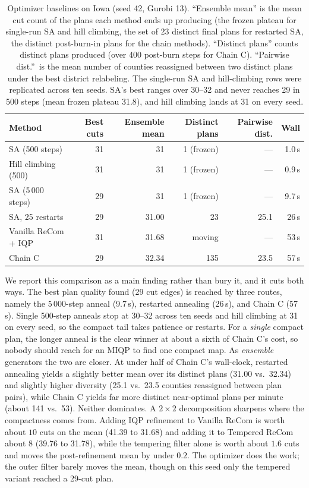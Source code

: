 \documentclass[11pt]{article}
\begin{document}
\begin{table}[H]
\centering
\small
\begin{tabular}{lrrrrr}
\toprule
Method & Best cuts & Ensemble mean & Distinct plans & Pairwise dist. & Wall \\
\midrule
SA (500 steps)           & 31 & 31    & 1 (frozen)  & ---  & 1.0\,s \\
Hill climbing (500)      & 31 & 31    & 1 (frozen)  & ---  & 0.9\,s \\
SA (5\,000 steps)        & 29 & 31    & 1 (frozen)  & ---  & 9.7\,s \\
SA, 25 restarts          & 29 & 31.00 & 23          & 25.1 & 26\,s \\
Vanilla ReCom + IQP      & 31 & 31.68 & moving      & ---  & 53\,s \\
Chain C                  & 29 & 32.34 & 135         & 23.5 & 57\,s \\
\bottomrule
\end{tabular}
\caption{Optimizer baselines on Iowa (seed 42,
  Gurobi 13). ``Ensemble mean'' is the mean cut count of the plans
  each method ends up producing (the frozen plateau for single-run
  SA and hill climbing, the set of 23 distinct final plans for
  restarted SA, the distinct post-burn-in plans for the chain
  methods). ``Distinct plans'' counts distinct plans produced (over
  400 post-burn steps for Chain C). ``Pairwise dist.''\ is the mean
  number of counties reassigned between two distinct plans under the
  best district relabeling. The single-run SA and hill-climbing rows
  were replicated across ten seeds. SA's best ranges over 30--32 and
  never reaches 29 in 500 steps (mean frozen plateau 31.8), and hill
  climbing lands at 31 on every
  seed.}\label{tab:optimizer-baselines}
\end{table}

We report this comparison as a main finding rather than bury it, and
it cuts both ways. The best plan quality found (29 cut edges) is
reached by three routes, namely the $5\,000$-step anneal (9.7\,s),
restarted annealing (26\,s), and Chain C (57\,s). Single 500-step
anneals stop at 30--32 across ten seeds and hill climbing at 31 on
every seed, so the compact tail takes patience or restarts. For a
\emph{single} compact plan, the longer anneal is the clear winner at
about a sixth of Chain C's cost, so nobody should reach for an MIQP
to find one compact map. As \emph{ensemble} generators the two are
closer. At under half of Chain C's wall-clock, restarted annealing yields a
slightly better mean over its distinct plans (31.00 vs.\ 32.34) and
slightly higher diversity (25.1 vs.\ 23.5 counties reassigned between
plan pairs), while Chain C yields far more distinct near-optimal
plans per minute (about 141 vs.\ 53). Neither dominates. A
$2 \times 2$
decomposition sharpens where the compactness comes from. Adding IQP
refinement to Vanilla ReCom is worth about $10$ cuts on the mean
(41.39 to 31.68) and adding it to Tempered ReCom about $8$ (39.76 to
31.78), while the tempering filter alone is worth about $1.6$ cuts
and moves the post-refinement mean by under $0.2$. The optimizer does
the work; the outer filter barely moves the mean, though on this seed
only the tempered variant reached a 29-cut plan.
\end{document}
